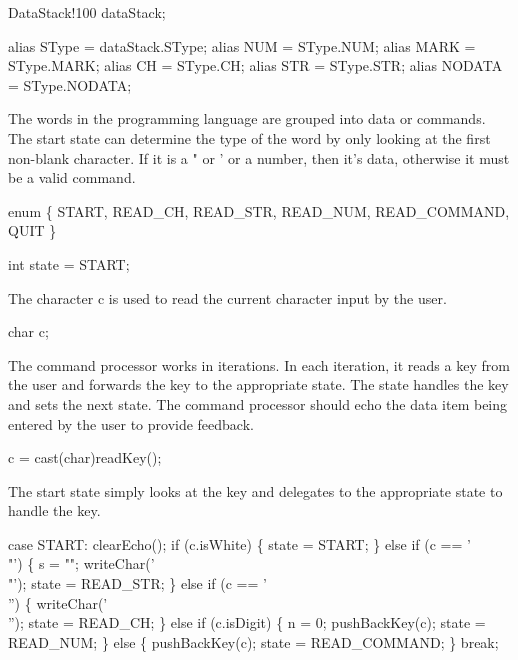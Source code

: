 DataStack!100 dataStack;

alias SType  = dataStack.SType;
alias NUM    = SType.NUM;
alias MARK   = SType.MARK;
alias CH     = SType.CH;
alias STR    = SType.STR;
alias NODATA = SType.NODATA;

\nwendcode{}The words in the programming language are grouped into data or
commands. The start state can determine the type of the word by only
looking at the first non-blank character. If it is a " or ' or a
number, then it's data, otherwise it must be a valid command.

\nwenddocs{}\endmoddef\nwstartdeflinemarkup\nwenddeflinemarkup
enum \{
  START,
  READ_CH,
  READ_STR,
  READ_NUM,
  READ_COMMAND,
  QUIT
\}

int state = START;

\nwendcode{}The character {\Tt{}c\nwendquote} is used to read the current character input by
the user.

\nwenddocs{}\endmoddef\nwstartdeflinemarkup\nwenddeflinemarkup
char c;

\nwendcode{}The command processor works in iterations. In each iteration, it
reads a key from the user and forwards the key to the appropriate
state. The state handles the key and sets the next state. The command
processor should echo the data item being entered by the user to
provide feedback.

\nwenddocs{}\endmoddef\nwstartdeflinemarkup\nwenddeflinemarkup
c   = cast(char)readKey();

\nwendcode{}The start state simply looks at the key and delegates to the
appropriate state to handle the key.

\nwenddocs{}\endmoddef\nwstartdeflinemarkup\nwenddeflinemarkup
case START:
  clearEcho();
  if (c.isWhite) \{
    state = START;
  \} else if (c == '\\"') \{
    s = "";
    writeChar('\\"');
    state = READ_STR;
  \} else if (c == '\\'') \{
    writeChar('\\'');
    state = READ_CH;
  \} else if (c.isDigit) \{
    n = 0;
    pushBackKey(c);
    state = READ_NUM;
  \} else \{
    pushBackKey(c);
    state = READ_COMMAND;
  \}
  break;

